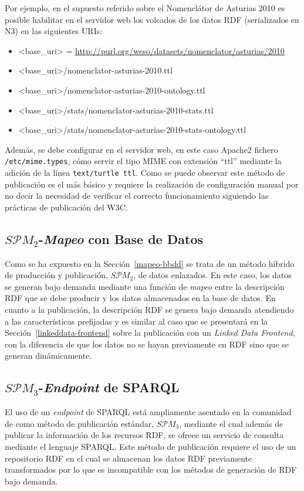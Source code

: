 Por ejemplo, en el supuesto referido sobre el Nomenclátor de Asturias 2010 es posible habilitar en el servidor
web los volcados de los datos \gls{RDF} (serializados en \gls{N3}) en las siguientes \gls{URI}s:

\begin{itemize}
 \item <base\_uri> = \url{http://purl.org/weso/datasets/nomenclator/asturias/2010}
 \item <base\_uri>/nomenclator-asturias-2010.ttl
 \item <base\_uri>/nomenclator-asturias-2010-ontology.ttl
 \item <base\_uri>/stats/nomenclator-asturias-2010-stats.ttl
 \item <base\_uri>/stats/nomenclator-asturias-2010-stats-ontology.ttl
\end{itemize}

Además, se debe configurar en el servidor web, en este caso Apache2 fichero \texttt{/etc/mime.types}, 
cómo servir el tipo MIME con extensión ``ttl'' mediante la adición de la línea \texttt{text/turtle	ttl}. Como se puede
observar este método de publicación es el más básico y requiere la realización de configuración manual por no decir
la necesidad de verificar el correcto funcionamiento siguiendo las prácticas de publicación del W3C.

\subsection{$S\mathcal{P}M_{2}$-\textit{Mapeo} con Base de Datos}
Como se ha expuesto en la Sección~\ref{mapeo-bbdd} se trata de un método híbrido de producción
y publicación, $S\mathcal{P}M_{2}$, de datos enlazados. En este caso, los datos se generan bajo demanda mediante
una función de \textit{mapeo} entre la descripción \gls{RDF} que se debe producir y los datos
almacenados en la base de datos. En cuanto a la publicación, la descripción RDF se genera
bajo demanda atendiendo a las características prefijadas y es similar al caso que se presentará en la Sección~\ref{linkeddata-frontend} 
sobre la publicación con un \textit{Linked Data Frontend}, con la diferencia de que los datos no se hayan previamente en RDF sino 
que se generan dinámicamente.

\subsection{$S\mathcal{P}M_{3}$-\textit{Endpoint} de SPARQL}\label{spm-3-pub}
El uso de un \textit{endpoint} de \gls{SPARQL} está ampliamente asentado en la comunidad
de \linkeddata como método de publicación estándar, $S\mathcal{P}M_{3}$, mediante
el cual además de publicar la información de los recursos RDF, se ofrece un servicio
de consulta mediante el lenguaje SPARQL. Este método de publicación requiere
el uso de un repositorio \gls{RDF} en el cual se almacenan los datos RDF previamente
transformados por lo que es incompatible con los métodos de generación de RDF bajo demanda.

